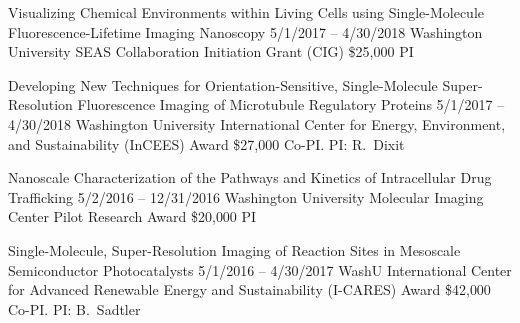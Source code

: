 \cvproject
  {Visualizing Chemical Environments within Living Cells using Single-Molecule Fluorescence-Lifetime Imaging Nanoscopy}
  {5/1/2017 -- 4/30/2018}
  {Washington University SEAS Collaboration Initiation Grant (CIG)}
  {\$25{,}000}
  {PI}
  
\cvproject
  {Developing New Techniques for Orientation-Sensitive, Single-Molecule Super-Resolution Fluorescence Imaging of Microtubule Regulatory Proteins}
  {5/1/2017 -- 4/30/2018}
  {Washington University International Center for Energy, Environment, and Sustainability (InCEES) Award}
  {\$27{,}000}
  {Co-PI. PI: R.\ Dixit}
  
\cvproject
  {Nanoscale Characterization of the Pathways and Kinetics of Intracellular Drug Trafficking}
  {5/2/2016 -- 12/31/2016}
  {Washington University Molecular Imaging Center Pilot Research Award}
  {\$20{,}000}
  {PI}
  
\cvproject
  {Single-Molecule, Super-Resolution Imaging of Reaction Sites in Mesoscale Semiconductor Photocatalysts}
  {5/1/2016 -- 4/30/2017}
  {WashU International Center for Advanced Renewable Energy and Sustainability (I-CARES) Award}
  {\$42{,}000}
  {Co-PI. PI: B.\ Sadtler}

% 